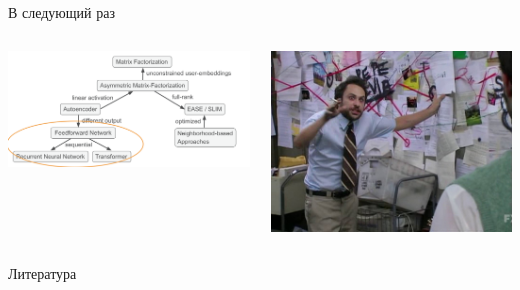 \documentclass[11pt,aspectratio=169,handout]{beamer}
\begin{document}
\begin{frame}{В следующий раз}

\begin{columns}

\begin{column}{0.47\textwidth} 
\begin{center}
\includegraphics[scale=0.18]{images/relationships.png}
\end{center}
\end{column}

\begin{column}{0.47\textwidth}
\begin{center}
\includegraphics[scale=0.15]{images/conspiracy.jpeg}
\end{center}
\end{column}

\end{columns}

\end{frame}

\begin{frame}[allowframebreaks]{Литература}




\end{frame}
\end{document}
